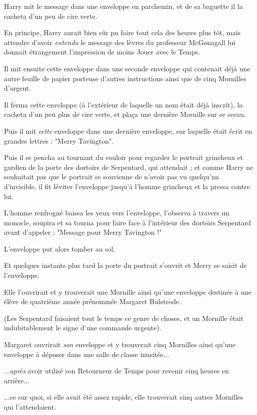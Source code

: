 Harry mit le message dans une enveloppe en parchemin, et de sa baguette il la cacheta d'un peu de cire verte.

En principe, Harry aurait bien sûr pu faire tout cela des heures plus tôt, mais attendre d'avoir \emph{entendu}  le message des lèvres du professeur McGonagall lui donnait étrangement l'impression de moins Jouer avec le Temps.

Il mit ensuite cette enveloppe dans une seconde enveloppe qui contenait déjà une autre feuille de papier porteuse d'autres instructions ainsi que de cinq Mornilles d'argent.

Il ferma cette enveloppe (à l'extérieur de laquelle un nom était déjà inscrit), la cacheta d'un peu plus de cire verte, et plaça une dernière Mornille sur ce sceau.

Puis il mit \emph{cette}  enveloppe dans une dernière enveloppe, sur laquelle était écrit en grandes lettres : "Merry Tavington".

Puis il se pencha au tournant du couloir pour regarder le portrait grincheux et gardien de la porte des dortoirs de Serpentard, qui attendait ; et comme Harry ne souhaitait pas que le portrait se souvienne de n'avoir pas vu quelqu'un d'invisible, il fit léviter l'enveloppe jusqu'à l'homme grincheux et la pressa contre lui.

L'homme renfrogné baissa les yeux vers l'enveloppe, l'observa à travers un monocle, soupira et sa tourna pour faire face à l'intérieur des dortoirs Serpentard avant d'appeler : "Message pour Merry Tavington !"

L'enveloppe put alors tomber au sol.

Et quelques instants plus tard la porte du portrait s'ouvrit et Merry se saisit de l'enveloppe.

Elle l'ouvrirait et y trouverait une Mornille ainsi qu'une enveloppe destinée à une élève de quatrième année prénommée Margaret Bulstrode.

(Les Serpentard faisaient tout le temps ce genre de choses, et un Mornille était indubitablement le signe d'une commande urgente).

Margaret ouvrirait \emph{son}  enveloppe et y trouverait cinq Mornilles ainsi qu'une enveloppe à déposer dans une salle de classe inusitée...

...\emph{après}  avoir utilisé son Retourneur de Temps pour revenir cinq heures en arrière...

...ce sur quoi, si elle avait été assez rapide, elle trouverait cinq autres Mornilles qui l'attendaient.

